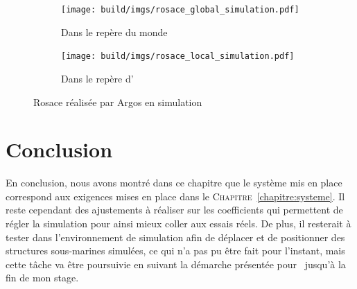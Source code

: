 			\begin{figure}[!htb]
				\centering
				\begin{subfigure}[t]{0.48\textwidth}
					\centering
					\texttt{[image: build/imgs/rosace\_global\_simulation.pdf]}
					\caption{Dans le repère du monde}
				\end{subfigure}
				\hfill
				\begin{subfigure}[t]{0.48\textwidth}
					\centering
					\texttt{[image: build/imgs/rosace\_local\_simulation.pdf]}
					\caption{Dans le repère d'\argos{}}
				\end{subfigure}
				\caption{Rosace réalisée par Argos en simulation}
				\label{fig:rosace_argos_simulation}
			\end{figure}

	\section{Conclusion}

		En conclusion, nous avons montré dans ce chapitre que le système mis en place correspond aux exigences mises en place dans le \textsc{Chapitre}~\ref{chapitre:systeme}. Il reste cependant des ajustements à réaliser sur les coefficients qui permettent de régler la simulation pour ainsi mieux coller aux essais réels. De plus, il resterait à tester \atoll{} dans l'environnement de simulation afin de déplacer et de positionner des structures sous-marines simulées, ce qui n'a pas pu être fait pour l'instant, mais cette tâche va être poursuivie en suivant la démarche présentée pour \argos{} jusqu'à la fin de mon stage.